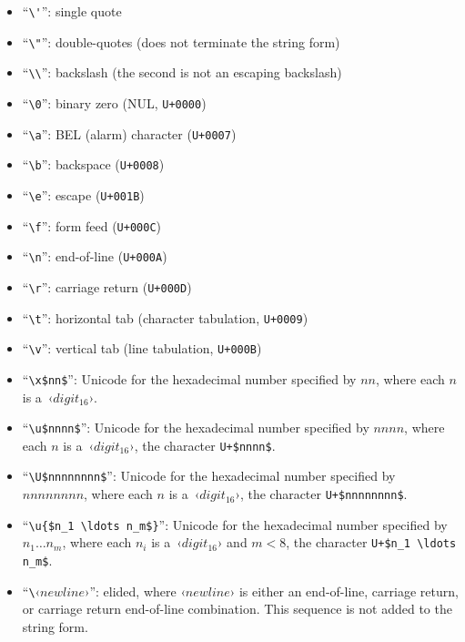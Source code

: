 \begin{itemize}
  \item ``\lstinline!\'!'': single quote
  \item ``\lstinline!\"!'': double-quotes (does not terminate the string form)
  \item ``\lstinline!\\!'': backslash (the second is not an escaping backslash)
  \item ``\lstinline!\0!'': binary zero (NUL, \lstinline!U+0000!)
  \item ``\lstinline!\a!'': BEL (alarm) character (\lstinline!U+0007!)
  \item ``\lstinline!\b!'': backspace (\lstinline!U+0008!)
  \item ``\lstinline!\e!'': escape (\lstinline!U+001B!)
  \item ``\lstinline!\f!'': form feed (\lstinline!U+000C!)
  \item ``\lstinline!\n!'': end-of-line (\lstinline!U+000A!)
  \item ``\lstinline!\r!'': carriage return (\lstinline!U+000D!)
  \item ``\lstinline!\t!'': horizontal tab (character tabulation, \lstinline!U+0009!)
  \item ``\lstinline!\v!'': vertical tab (line tabulation, \lstinline!U+000B!)
  
  \item ``\lstinline!\x$nn$!'': Unicode for the hexadecimal number specified by $nn$, where each $n$ is a~‹$digit_{16}$›.
  \item ``\lstinline!\u$nnnn$!'': Unicode for the hexadecimal number specified by $nnnn$, where each $n$ is a~‹$digit_{16}$›, the character \lstinline!U+$nnnn$!.
  \item ``\lstinline!\U$nnnnnnnn$!'': Unicode for the hexadecimal number specified by $nnnnnnnn$, where each $n$ is a~‹$digit_{16}$›, the character \lstinline!U+$nnnnnnnn$!.
  
  \item ``\lstinline!\u{$n_1 \ldots n_m$}!'': Unicode for the hexadecimal number specified by $n_1 \ldots n_m$, where each $n_i$ is a~‹$digit_{16}$› and $m < 8$, the character \lstinline!U+$n_1 \ldots n_m$!.
  
  
  \item ``\lstinline!\!‹$newline$›'': elided, where ‹$newline$› is either an end-of-line, carriage return, or carriage return end-of-line combination. This sequence is not added to the string form.
\end{itemize}

